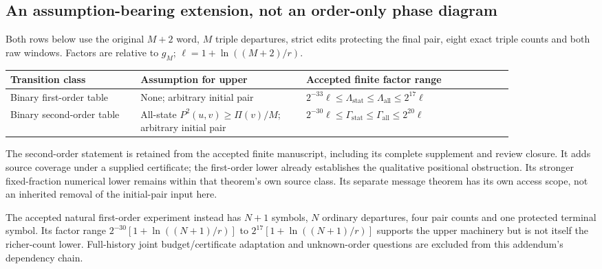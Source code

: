 \documentclass[10pt]{article}
\newcommand{\stat}{\mathrm{stat}}
\newcommand{\all}{\mathrm{all}}
\begin{document}
\subsection*{An assumption-bearing extension, not an order-only phase diagram}
Both rows below use the original $M+2$ word, $M$ triple departures, strict edits protecting the final pair, eight exact triple counts and both raw windows. Factors are relative to $g_M$; $\ell=1+\ln((M+2)/r)$.
\begin{center}\small
\begin{tabular}{p{0.22\linewidth}p{0.28\linewidth}p{0.35\linewidth}}
\toprule
Transition class & Assumption for upper & Accepted finite factor range\\
\midrule
Binary first-order table & None; arbitrary initial pair & $2^{-33}\ell\le\Lambda_\stat\le\Lambda_\all\le2^{17}\ell$\\[5pt]
Binary second-order table & All-state $P^2(u,v)\ge\Pi(v)/M$; arbitrary initial pair & $2^{-30}\ell\le\Gamma_\stat\le\Gamma_\all\le2^{20}\ell$\\
\bottomrule
\end{tabular}
\end{center}
The second-order statement is retained from the accepted finite manuscript, including its complete supplement and review closure. It adds source coverage under a supplied certificate; the first-order lower already establishes the qualitative positional obstruction. Its stronger fixed-fraction numerical lower remains within that theorem's own source class. Its separate message theorem has its own access scope, not an inherited removal of the initial-pair input here.

The accepted natural first-order experiment instead has $N+1$ symbols, $N$ ordinary departures, four pair counts and one protected terminal symbol. Its factor range $2^{-30}[1+\ln((N+1)/r)]$ to $2^{17}[1+\ln((N+1)/r)]$ supports the upper machinery but is not itself the richer-count lower. Full-history joint budget/certificate adaptation and unknown-order questions are excluded from this addendum's dependency chain.
\newpage
\end{document}
